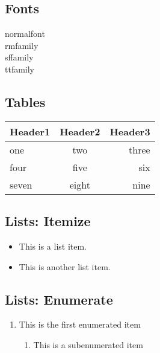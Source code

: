 \documentclass[a4paper, 10pt]{article}
\begin{document}
 \subsection{Fonts}
  {\normalfont normalfont}\\
  {\rmfamily rmfamily}\\
  {\sffamily sffamily}\\
  {\ttfamily ttfamily}
  
 \subsection{Tables}
  \begin{tabular}[h!]{|l|c|r|}
   \textbf{Header1}&\textbf{Header2}&\textbf{Header3}\\
   \hline
   one&two&three\\
   four&five&six\\
   seven&eight&nine
  \end{tabular}
 

 \subsection{Lists: Itemize}
  \begin{itemize}
   \item
   This is a list item.
   \item
   This is another list item.
  \end{itemize}
  
 \subsection{Lists: Enumerate}
  \begin{enumerate}
   \item
    This is the first enumerated item
   \begin{enumerate}
    \item
     This is a subenumerated item
   \end{enumerate}
  \end{enumerate}
  
\end{document}
